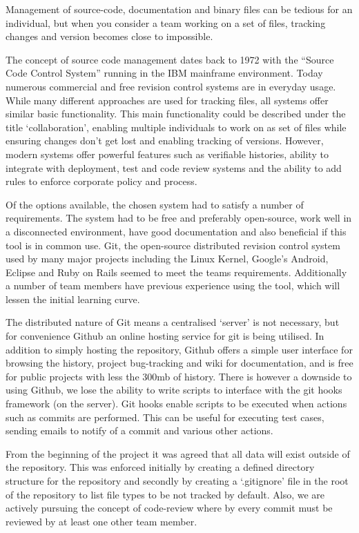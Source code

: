 Management of source-code, documentation and binary files can be tedious for an individual, but when you consider a team working on a set of files, tracking changes and version becomes close to impossible.

The concept of source code management dates back to 1972\cite{website:catb_org} with the “Source Code Control System” running in the IBM mainframe environment. Today numerous commercial and free revision control systems are in everyday usage. While many different approaches are used for tracking files, all systems offer similar basic functionality. This main functionality could be described under the title ‘collaboration’, enabling multiple individuals to work on as set of files while ensuring changes don’t get lost and enabling tracking of versions. However, modern systems offer powerful features such as verifiable histories, ability to integrate with deployment, test and code review systems and the ability to add rules to enforce corporate policy and process.

Of the options available, the chosen system had to satisfy a number of requirements. The system had to be free and preferably open-source, work well in a disconnected environment, have good documentation and also beneficial if this tool is in common use. Git\cite{website:git_scm}, the open-source distributed revision control system used by many major projects including the Linux Kernel, Google’s Android, Eclipse and Ruby on Rails seemed to meet the teams requirements. Additionally a number of team members have previous experience using the tool, which will lessen the initial learning curve.

The distributed nature of Git means a centralised ‘server’ is not necessary, but for convenience Github\cite{website:github} an online hosting service for git is being utilised. In addition to simply hosting the repository, Github offers a simple user interface for browsing the history, project bug-tracking and wiki for documentation, and is free for public projects with less the 300mb of history. There is however a downside to using Github, we lose the ability to write scripts to interface with the git hooks framework (on the server). Git hooks enable scripts to be executed when actions such as commits are performed. This can be useful for executing test cases, sending emails to notify of a commit and various other actions.

From the beginning of the project it was agreed that all data will exist outside of the repository. This was enforced initially by creating a defined directory structure for the repository and secondly by creating a ‘.gitignore’ file in the root of the repository to list file types to be not tracked by default. Also, we are actively pursuing the concept of code-review where by every commit must be reviewed by at least one other team member. 

